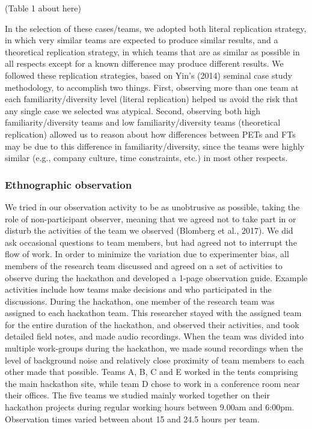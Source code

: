\documentclass{hcij}
\begin{document}
(Table 1 about here)

In the selection of these cases/teams, we adopted both literal replication strategy, in which very similar teams are expected to produce similar results, and a theoretical replication strategy, in which teams that are as similar as possible in all respects except for a known difference may produce different results. We followed these replication strategies, based on Yin’s (2014) seminal case study methodology, to accomplish two things. First, observing more than one team at each familiarity/diversity level (literal replication) helped us avoid the risk that any single case we selected was atypical. Second, observing both high familiarity/diversity teams and low familiarity/diversity teams (theoretical replication) allowed us to reason about how differences between PETs and FTs may be due to this difference in familiarity/diversity, since the teams were highly similar (e.g., company culture, time constraints, etc.) in most other respects.

\subsubsection{Ethnographic observation}
We tried in our observation activity to be as unobtrusive as possible, taking the role of non-participant observer, meaning that we agreed not to take part in or disturb the activities of the team we observed (Blomberg et al., 2017). We did ask occasional questions to team members, but had agreed not to interrupt the flow of work. In order to minimize the variation due to experimenter bias, all members of the research team discussed and agreed on a set of activities to observe during the hackathon and developed a 1-page observation guide. Example activities include how teams make decisions and who participated in the discussions. During the hackathon, one member of the research team was assigned to each hackathon team. This researcher stayed with the assigned team for the entire duration of the hackathon, and observed their activities, and took detailed field notes, and made audio recordings. When the team was divided into multiple work-groups during the hackathon, we made sound recordings when the level of background noise and relatively close proximity of team members to each other made that possible. Teams A, B, C and E worked in the tents comprising the main hackathon site, while team D chose to work in a conference room near their offices. The five teams we studied mainly worked together on their hackathon projects during regular working hours between 9.00am and 6:00pm. Observation times varied between about 15 and 24.5 hours per team.
\end{document}
